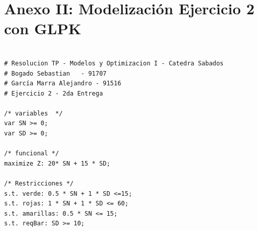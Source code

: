 \documentclass[a4paper,10pt]{article}
\begin{document}
\section{Anexo II: Modelizaci\'on Ejercicio 2 con GLPK}

 \begin{verbatim}

# Resolucion TP - Modelos y Optimizacion I - Catedra Sabados
# Bogado Sebastian 	 - 91707
# García Marra Alejandro - 91516
# Ejercicio 2 - 2da Entrega

/* variables  */
var SN >= 0;
var SD >= 0;

/* funcional */
maximize Z: 20* SN + 15 * SD;  

/* Restricciones */
s.t. verde: 0.5 * SN + 1 * SD <=15;
s.t. rojas: 1 * SN + 1 * SD <= 60;
s.t. amarillas: 0.5 * SN <= 15;
s.t. reqBar: SD >= 10;

 \end{verbatim}
\end{document}
